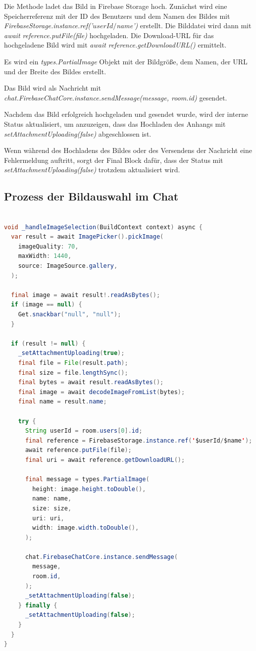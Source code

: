 Die Methode ladet das Bild in Firebase Storage hoch.
Zunächst wird eine Speicherreferenz mit der ID des Benutzers und dem Namen des Bildes mit \textit{FirebaseStorage.instance.ref('$userId/$name')} erstellt.
Die Bilddatei wird dann mit \textit{await reference.putFile(file)} hochgeladen.
Die Download-URL für das hochgeladene Bild wird mit \textit{await reference.getDownloadURL()} ermittelt.

Es wird ein \textit{types.PartialImage} Objekt mit der Bildgröße, dem Namen, der URL und der Breite des Bildes erstellt.

Das Bild wird als Nachricht mit \textit{chat.FirebaseChatCore.instance.sendMessage(message, room.id)} gesendet.

Nachdem das Bild erfolgreich hochgeladen und gesendet wurde, wird der interne Status aktualisiert, um anzuzeigen, dass das Hochladen des Anhangs mit \textit{setAttachmentUploading(false)} abgeschlossen ist.

Wenn während des Hochladens des Bildes oder des Versendens der Nachricht eine Fehlermeldung auftritt, sorgt der Final Block dafür, dass der Status mit \textit{setAttachmentUploading(false)} trotzdem aktualisiert wird.


\subsection{Prozess der Bildauswahl im Chat}

\begin{lstlisting}[language=Java,caption=Prozess der Bildauswahl und -verarbeitung,label=lst:fotoSelektion]  

void _handleImageSelection(BuildContext context) async {
  var result = await ImagePicker().pickImage(
    imageQuality: 70,
    maxWidth: 1440,
    source: ImageSource.gallery,
  );

  final image = await result!.readAsBytes();
  if (image == null) {
    Get.snackbar("null", "null");
  }

  if (result != null) {
    _setAttachmentUploading(true);
    final file = File(result.path);
    final size = file.lengthSync();
    final bytes = await result.readAsBytes();
    final image = await decodeImageFromList(bytes);
    final name = result.name;

    try {
      String userId = room.users[0].id;
      final reference = FirebaseStorage.instance.ref('$userId/$name');
      await reference.putFile(file);
      final uri = await reference.getDownloadURL();

      final message = types.PartialImage(
        height: image.height.toDouble(),
        name: name,
        size: size,
        uri: uri,
        width: image.width.toDouble(),
      );

      chat.FirebaseChatCore.instance.sendMessage(
        message,
        room.id,
      );
      _setAttachmentUploading(false);
    } finally {
      _setAttachmentUploading(false);
    }
  }
}

\end{lstlisting}

